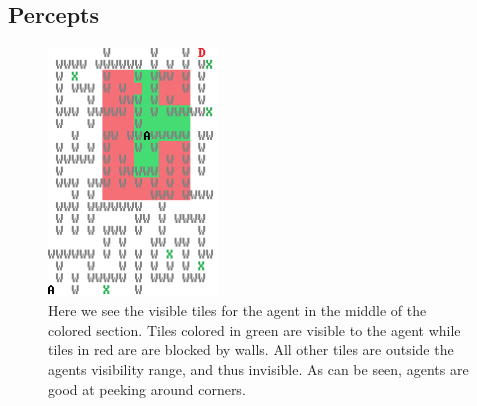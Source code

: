 \subsection*{Percepts}

\begin{figure}
\begin{centering}
\includegraphics[width=0.4\textwidth]{TileWorldColoredScrotVision}
\par\end{centering}

\caption{Here we see the visible tiles for the agent in the middle of the colored
section. Tiles colored in green are visible to the agent while tiles
in red are are blocked by walls. All other tiles are outside the agents
visibility range, and thus invisible. As can be seen, agents are good
at peeking around corners.\label{fig:maze-scrot-vision}}


\end{figure}


